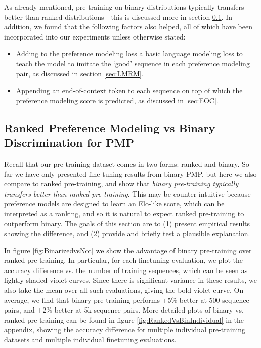 As already mentioned, pre-training on binary distributions typically transfers better than ranked distributions---this is discussed more in section \ref{sec:Letters}. In addition, we found that the following factors also helped, all of which have been incorporated into our experiments unless otherwise stated:

\begin{itemize}
    \item Adding to the preference modeling loss a basic language modeling loss to teach the model to imitate the `good' sequence in each preference modeling pair, as discussed in section \ref{sec:LMRM}.
    \item Appending an end-of-context token to each sequence on top of which the preference modeling score is predicted, as discussed in \ref{sec:EOC}.
\end{itemize}

\subsection{Ranked Preference Modeling vs Binary Discrimination for PMP}
\label{sec:Letters}

Recall that our pre-training dataset comes in two forms: ranked and binary. So far we have only presented fine-tuning results from binary PMP, but here we also compare to ranked pre-training, and show that {\it binary pre-training typically transfers better than ranked-pre-training}. This may be counter-intuitive because preference models are designed to learn an Elo-like score, which can be interpreted as a ranking, and so it is natural to expect ranked pre-training to outperform binary. The goals of this section are to (1) present empirical results showing the difference, and (2) provide and briefly test a plausible explanation.

In figure \ref{fig:BinarizedvsNot} we show the advantage of binary pre-training over ranked pre-training. In particular, for each finetuning evaluation, we plot the accuracy difference vs. the number of training sequences, which can be seen as lightly shaded violet curves. Since there is significant variance in these results, we also take the mean over all such evaluations, giving the bold violet curve. On average, we find that binary pre-training performs +5\% better at 500 sequence pairs, and +2\% better at 5k sequence pairs. More detailed plots of binary vs. ranked pre-training can be found in figure \ref{fig:RankedVsBinIndividual} in the appendix, showing the accuracy difference for multiple individual pre-training datasets and multiple individual finetuning evaluations.

